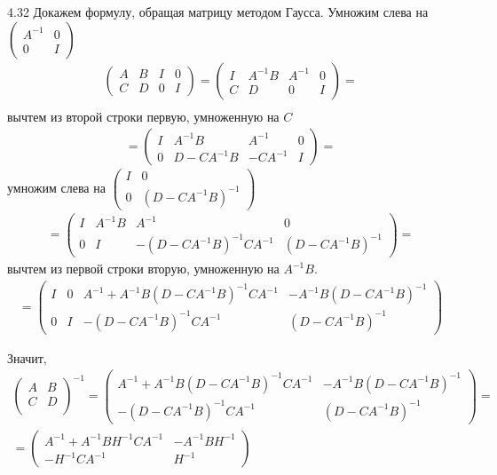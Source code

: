 \begin{solution}{{4.32}}
Докажем формулу, обращая матрицу методом Гаусса. Умножим слева на $\begin{pmatrix}
A^{-1} & 0\\
0 & I
\end{pmatrix}$
\begin{multline*}
\left(\begin{array}{cc|cc}
A & B & I & 0\\
C & D & 0 & I
\end{array}\right)=
\left(\begin{array}{cc|cc}
I & A^{-1}B & A^{-1} & 0\\
C & D & 0 & I
\end{array}\right)=\\
\end{multline*}
вычтем из второй строки первую, умноженную на $C$
\begin{multline*}
=\left(\begin{array}{cc|cc}
I & A^{-1}B & A^{-1} & 0\\
0 & D-CA^{-1}B & -CA^{-1} & I
\end{array}\right)=
\end{multline*}
умножим слева на $\begin{pmatrix}
I & 0\\
0 & (D-CA^{-1}B)^{-1}
\end{pmatrix}$
\begin{multline*}
=\left(\begin{array}{cc|cc}
I & A^{-1}B & A^{-1} & 0\\
0 & I & -(D-CA^{-1}B)^{-1}CA^{-1} & (D-CA^{-1}B)^{-1}
\end{array}\right)=
\end{multline*}
вычтем из первой строки вторую, умноженную на $A^{-1}B$.
\begin{multline*}
=\left(\begin{array}{cc|cc}
I & 0 & A^{-1}+A^{-1}B(D-CA^{-1}B)^{-1}CA^{-1} & -A^{-1}B(D-CA^{-1}B)^{-1}\\
0 & I & -(D-CA^{-1}B)^{-1}CA^{-1} & (D-CA^{-1}B)^{-1}
\end{array}\right)
\end{multline*}

Значит,
\begin{multline*}
\begin{pmatrix} A & B \\ C & D \\ \end{pmatrix}^{-1}
=\left(\begin{array}{cc}
A^{-1}+A^{-1}B(D-CA^{-1}B)^{-1}CA^{-1} & -A^{-1}B(D-CA^{-1}B)^{-1}\\
-(D-CA^{-1}B)^{-1}CA^{-1} & (D-CA^{-1}B)^{-1}
\end{array}\right)=\\=
\begin{pmatrix} A^{-1} +A^{-1} BH^{-1} CA^{-1}  & -A^{-1} BH^{-1}\\ -H^{-1} CA^{-1}  & H^{-1}\end{pmatrix}
\end{multline*}


\end{solution}
